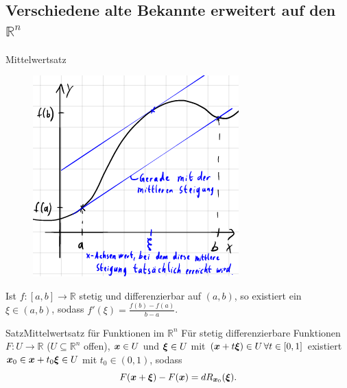 \subsection[Verschiedene alte Bekannte erweitert auf den R hoch n]{Verschiedene alte Bekannte erweitert auf den $\mathbb{R}^n$}
\begin{Wiederholung}
{Mittelwertsatz}
\begin{figure}
 \vspace{-15pt}
\includegraphics[width=.23\textwidth]{Dateien/08/09Mittelwertsatz.PNG}
 \vspace{-15pt}
\end{figure}
Ist $f:[a,b]\to\mathbb{R}$ stetig und differenzierbar auf $(a,b)$, so existiert ein\\
$\xi\in(a,b)$, sodass $f'(\xi)=\frac{f(b)-f(a)}{b-a}$.\\
\end{Wiederholung}
\begin{Satz}
{Satz}{Mittelwertsatz für Funktionen im $\mathbb{R}^n$}
Für stetig differenzierbare Funktionen $F:U\to\mathbb{R}$ ($U\subseteq\mathbb{R}^n$ offen), ${{\text{\boldmath${x}$}}}\in U$ und ${{\text{\boldmath${\xi}$}}}\in U$ mit $({{\text{\boldmath${x}$}}}+t{{\text{\boldmath${\xi}$}}})\in U\,\forall t\in[0,1]$ existiert ${{\text{\boldmath${x}$}}}_0\in {{\text{\boldmath${x}$}}}+t_0{{\text{\boldmath${\xi}$}}}\in U$ mit $t_0\in(0,1)$, sodass
\begin{equation}
    F({{\text{\boldmath${x}$}}}+{{\text{\boldmath${\xi}$}}})-F({{\text{\boldmath${x}$}}})=dR_{{{\text{\boldmath${x}$}}}_0}({{\text{\boldmath${\xi}$}}}).
\end{equation}
\end{Satz}
